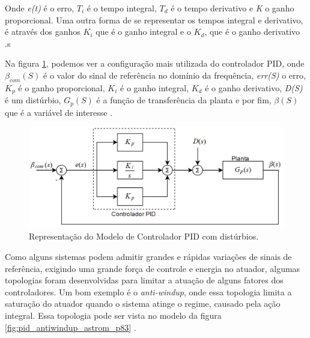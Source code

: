 Onde \textit{e(t)} é o erro, \textit{$T_i$} é o tempo integral, \textit{$T_d$} é o tempo derivativo e \textit{K} o ganho proporcional. Uma outra forma de se representar os tempos integral e derivativo, é através dos ganhos \textit{$K_i$} que é o ganho integral e o \textit{$K_d$}, que é o ganho derivativo \cite{Astrom1995}.s

Na figura \ref{fig:pid_controller_Snider_p35}, podemos ver a configuração mais utilizada do controlador PID, onde $\beta_{com}(S)$ é o valor do sinal de referência no domínio da frequência, \textit{err(S)} o erro, \textit{$K_p$} é o ganho proporcional, \textit{$K_i$} é o ganho integral, \textit{$K_d$} é o ganho derivativo, \textit{D(S)} é um distúrbio, \textit{$G_p(S)$} é a função de transferência da planta e por fim, \textit{$\beta(S)$} que é a variável de interesse \cite{Snider}.

\begin{figure}[H]
  \caption{Representação do Modelo de Controlador PID com distúrbios.}
  \begin{center}
      \includegraphics[scale=0.55]{referencial/img/pid_controller_Snider_p35}
  \end{center}
  \label{fig:pid_controller_Snider_p35}
\end{figure}

Como alguns sistemas podem admitir grandes e rápidas variações de sinais de referência, exigindo uma grande força de controle e energia no atuador, algumas topologias foram desenvolvidas para limitar a atuação de alguns fatores dos controladores. Um bom exemplo é o \textit{anti-windup}, onde essa topologia limita a saturação do atuador quando o sistema atinge o regime, causado pela ação integral. Essa topologia pode ser vista no modelo da figura \ref{fig:pid_antiwindup_astrom_p83} \cite{Astrom1995}.

